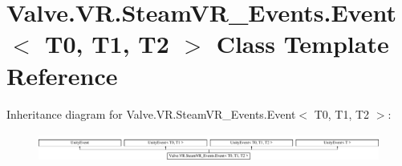 \hypertarget{class_valve_1_1_v_r_1_1_steam_v_r___events_1_1_event}{}\section{Valve.\+V\+R.\+Steam\+V\+R\+\_\+\+Events.\+Event$<$ T0, T1, T2 $>$ Class Template Reference}
\label{class_valve_1_1_v_r_1_1_steam_v_r___events_1_1_event}
Inheritance diagram for Valve.\+V\+R.\+Steam\+V\+R\+\_\+\+Events.\+Event$<$ T0, T1, T2 $>$\+:\begin{figure}[H]
\begin{center}
\leavevmode
\includegraphics[height=0.952381cm]{class_valve_1_1_v_r_1_1_steam_v_r___events_1_1_event}
\end{center}
\end{figure}
